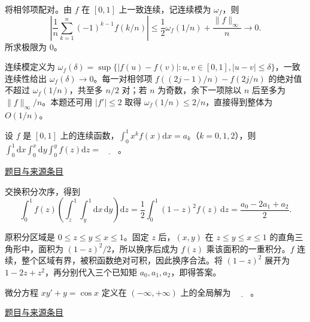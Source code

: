\documentclass[12pt,fontset=fandol]{ctexart}
\begin{document}
\begin{solve}\label{ans:fin15-high:2}

将相邻项配对。由 $f$ 在 $[0,1]$ 上一致连续，记连续模为 $\omega_f$，则
\[
\left|\frac1n\sum_{k=1}^n(-1)^{k-1}f(k/n)\right|
\le\frac12\omega_f(1/n)+\frac{\|f\|_\infty}{n}\longrightarrow0.
\]
所求极限为 $\boxed0$。

连续模定义为 $\omega_f(\delta)=\sup\{|f(u)-f(v)|:u,v\in[0,1],|u-v|\le\delta\}$，一致连续性给出 $\omega_f(\delta)\to0$。每一对相邻项 $f((2j-1)/n)-f(2j/n)$ 的绝对值不超过 $\omega_f(1/n)$，共至多 $n/2$ 对；若 $n$ 为奇数，余下一项除以 $n$ 后至多为 $\|f\|_\infty/n$。本题还可用 $|f'|\le2$ 取得 $\omega_f(1/n)\le2/n$，直接得到整体为 $O(1/n)$。

\end{solve}

\begin{example}[来源序号3]\label{ex:fin15-high:3}\label{pr:fin15-high:3}

设 $f$ 是 $[0,1]$ 上的连续函数，$\int_{0}^{1}x^{k}f(x)\mathrm{d}x = a_{k}$（$k = 0,1,2$），则 $\int_{0}^{1}\mathrm{d}x\int_{0}^{x}\mathrm{d}y\int_{0}^{y}f(z)\mathrm{d}z = \underline{\qquad}$。

\par\href{https://github.com/lzxcr/cmc-mathematics/blob/64916fa1fdbc3e444a652eca204d5669058ee321/src/problems/finals/15/03.md}{题目与来源条目}

\end{example}

\begin{solve}\label{ans:fin15-high:3}

交换积分次序，得到
\[
\int_0^1f(z)\left(\int_z^1\int_y^1\mathrm dx\,\mathrm dy\right)\mathrm dz
=\frac12\int_0^1(1-z)^2f(z)\,\mathrm dz
=\boxed{\frac{a_0-2a_1+a_2}{2}}.
\]

原积分区域是 $0\le z\le y\le x\le1$。固定 $z$ 后，$(x,y)$ 在 $z\le y\le x\le1$ 的直角三角形中，面积为 $(1-z)^2/2$，所以换序后成为 $f(z)$ 乘该面积的一重积分。$f$ 连续，整个区域有界，被积函数绝对可积，因此换序合法。将 $(1-z)^2$ 展开为 $1-2z+z^2$，再分别代入三个已知矩 $a_0,a_1,a_2$，即得答案。

\end{solve}

\begin{example}[来源序号4]\label{ex:fin15-high:4}\label{pr:fin15-high:4}

微分方程 $xy' + y = \cos x$ 定义在 $(-\infty,+\infty)$ 上的全局解为 $\underline{\qquad}$。

\par\href{https://github.com/lzxcr/cmc-mathematics/blob/64916fa1fdbc3e444a652eca204d5669058ee321/src/problems/finals/15/04.md}{题目与来源条目}

\end{example}
\end{document}
